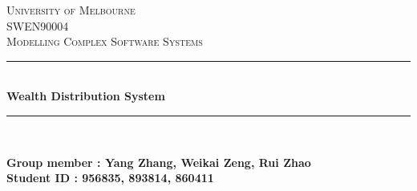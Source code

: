 \begin{titlepage}

\newcommand{\HRule}{\rule{\linewidth}{0.5mm}} %

\center %
 

\textsc{\LARGE University of Melbourne}\\[1.5cm] %
\textsc{\Large SWEN90004}\\[0.5cm] %
\textsc{\large Modelling Complex Software Systems}\\[0.5cm] %


\HRule \\[0.4cm]
{ \huge \bfseries Wealth Distribution System}\\[0.4cm] %
\HRule \\[1.5cm]


\begin{minipage}{0.4\textwidth}
	\bfseries Group member : Yang Zhang, Weikai Zeng, Rui Zhao\\
	\bfseries Student ID : 956835, 893814, 860411
\end{minipage}\\[2cm]




\end{titlepage}
